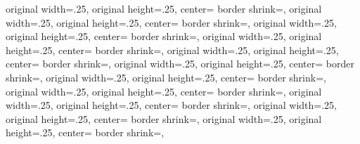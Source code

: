 {{	original width=.25\pgfpageoptionheight,%
	original height=.25\pgfpageoptionwidth,%
	center=\pgfpoint{.5\pgfphysicalwidth}{\pgfphysicalheight}%
	}%
  {%
	border shrink=\pgfpageoptionborder,%
	original width=.25\pgfpageoptionheight,%
	original height=.25\pgfpageoptionwidth,%
	center=\pgfpoint{.25\pgfphysicalwidth}{\pgfphysicalheight}%
  }%
  {%
	border shrink=\pgfpageoptionborder,%
	original width=.25\pgfpageoptionheight,%
	original height=.25\pgfpageoptionwidth,%
	center=\pgfpoint{0\pgfphysicalwidth}{\pgfphysicalheight}%
  }%
  {%
	border shrink=\pgfpageoptionborder,%
	original width=.25\pgfpageoptionheight,%
	original height=.25\pgfpageoptionwidth,%
	center=\pgfpoint{.75\pgfphysicalwidth}{.75\pgfphysicalheight}%
  }%
  {%
	border shrink=\pgfpageoptionborder,%
	original width=.25\pgfpageoptionheight,%
	original height=.25\pgfpageoptionwidth,%
	center=\pgfpoint{.5\pgfphysicalwidth}{.75\pgfphysicalheight}%
  }%
  {%
	border shrink=\pgfpageoptionborder,%
	original width=.25\pgfpageoptionheight,%
	original height=.25\pgfpageoptionwidth,%
	center=\pgfpoint{.25\pgfphysicalwidth}{.75\pgfphysicalheight}%
  }%
  {%
	border shrink=\pgfpageoptionborder,%
	original width=.25\pgfpageoptionheight,%
	original height=.25\pgfpageoptionwidth,%
	center=\pgfpoint{0\pgfphysicalwidth}{.75\pgfphysicalheight}%
  }%
  {%
	border shrink=\pgfpageoptionborder,%
	original width=.25\pgfpageoptionheight,%
	original height=.25\pgfpageoptionwidth,%
	center=\pgfpoint{.75\pgfphysicalwidth}{.5\pgfphysicalheight}%
  }%
  {%
	border shrink=\pgfpageoptionborder,%
	original width=.25\pgfpageoptionheight,%
	original height=.25\pgfpageoptionwidth,%
	center=\pgfpoint{.5\pgfphysicalwidth}{.5\pgfphysicalheight}%
  }%
  {%
	border shrink=\pgfpageoptionborder,%
	original width=.25\pgfpageoptionheight,%
	original height=.25\pgfpageoptionwidth,%
	center=\pgfpoint{.25\pgfphysicalwidth}{.5\pgfphysicalheight}%
  }%
  {%
	border shrink=\pgfpageoptionborder,%
	original width=.25\pgfpageoptionheight,%
	original height=.25\pgfpageoptionwidth,%
	center=\pgfpoint{0\pgfphysicalwidth}{.5\pgfphysicalheight}%
  }%
  {%
	border shrink=\pgfpageoptionborder,%
}}
